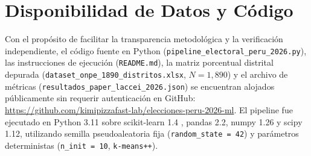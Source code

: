\documentclass[conference,10pt,letterpaper]{IEEEtran}
\begin{document}
\section*{Disponibilidad de Datos y Código}

Con el propósito de facilitar la transparencia metodológica y la verificación independiente, el código fuente en Python (\texttt{pipeline\_electoral\_peru\_2026.py}), las instrucciones de ejecución (\texttt{README.md}), la matriz porcentual distrital depurada (\texttt{dataset\_onpe\_1890\_distritos.xlsx}, $N = 1,890$) y el archivo de métricas (\texttt{resultados\_paper\_laccei\_2026.json}) se encuentran alojados públicamente sin requerir autenticación en GitHub: \url{https://github.com/kimipizzafast-lab/elecciones-peru-2026-ml}. El pipeline fue ejecutado en Python 3.11 sobre scikit-learn 1.4 \cite{pedregosa2011}, pandas 2.2, numpy 1.26 y scipy 1.12, utilizando semilla pseudoaleatoria fija (\texttt{random\_state = 42}) y parámetros deterministas (\texttt{n\_init = 10}, \texttt{k-means++}).

\newpage
\end{document}
